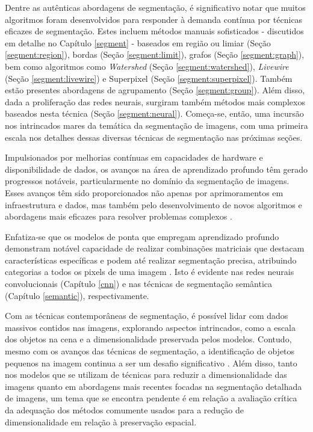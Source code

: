 Dentre as autênticas abordagens de segmentação, é significativo notar que muitos algoritmos foram desenvolvidos para responder à demanda contínua por técnicas eficazes de segmentação. Estes incluem métodos manuais sofisticados - discutidos em detalhe no Capítulo \ref{segment} - baseados em região ou limiar (Seção \ref{segment:region}), bordas (Seção \ref{segment:limit}), grafos (Seção \ref{segment:graph}), bem como algoritmos como \textit{Watershed} (Seção \ref{segment:watershed}), \textit{Livewire} (Seção \ref{segment:livewire}) e Superpixel (Seção \ref{segment:superpixel}). Também estão presentes abordagens de agrupamento (Seção \ref{segment:group}). Além disso, dada a proliferação das redes neurais, surgiram também métodos mais complexos baseados nesta técnica (Seção \ref{segment:neural}). Começa-se, então, uma incursão nos intrincados mares da temática da segmentação de imagens, com uma primeira escala nos detalhes dessas diversas técnicas de segmentação nas próximas seções.

Impulsionados por melhorias contínuas em capacidades de hardware e disponibilidade de dados, os avanços na área de aprendizado profundo têm gerado progressos notáveis, particularmente no domínio da segmentação de imagens. Esses avanços têm sido proporcionados não apenas por aprimoramentos em infraestrutura e dados, mas também pelo desenvolvimento de novos algoritmos e abordagens mais eficazes para resolver problemas complexos \citep{Szegedy2015}.

Enfatiza-se que os modelos de ponta que empregam aprendizado profundo demonstram notável capacidade de realizar combinações matriciais que destacam características específicas e podem até realizar segmentação precisa, atribuindo categorias a todos os pixels de uma imagem \citep{Minaee2021}. Isto é evidente nas redes neurais convolucionais (Capítulo \ref{cnn}) e nas técnicas de segmentação semântica (Capítulo \ref{semantic}), respectivamente.

Com as técnicas contemporâneas de segmentação, é possível lidar com dados massivos contidos nas imagens, explorando aspectos intrincados, como a escala dos objetos na cena e a dimensionalidade preservada pelos modelos. Contudo, mesmo com os avanços das técnicas de segmentação, a identificação de objetos pequenos na imagem continua a ser um desafio significativo \citep{Sang2023Small-ObjectAttention, Su2021Small-scaleFusion}. Além disso, tanto nos modelos que se utilizam de técnicas para reduzir a dimensionalidade das imagens quanto em abordagens mais recentes focadas na segmentação detalhada de imagens, um tema que se encontra pendente é em relação a avaliação crítica da adequação dos métodos comumente usados para a redução de dimensionalidade em relação à preservação espacial.

